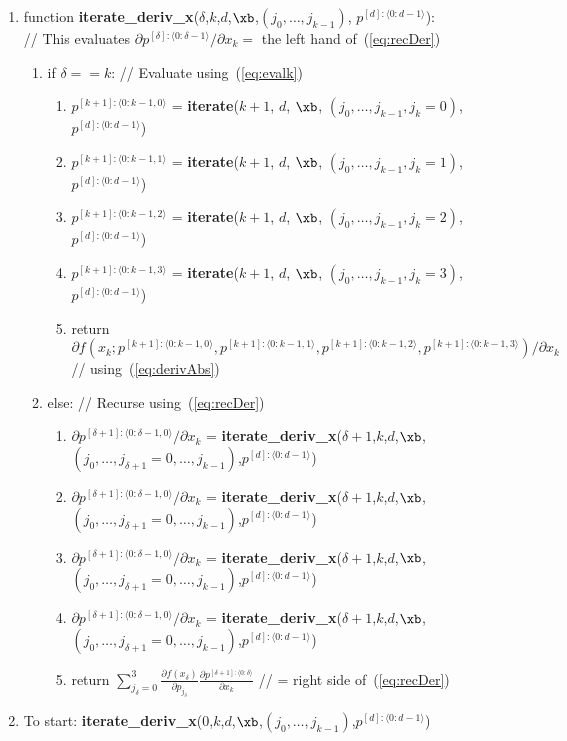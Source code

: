 \documentclass[11pt]{article}
\begin{document}
\begin{enumerate}
\item function \textbf{iterate\_deriv\_x}($\delta$,$k$,$d$,$\xb$,$(j_0, \dots, j_{k-1})$, $p^{[d]:\langle 0:d-1 \rangle}$): \\
// This evaluates $\partial p^{[\delta]: \langle 0:\delta-1 \rangle} / \partial x_k = $ the left hand of~(\ref{eq:recDer})
\begin{enumerate}
\item if $\delta == k$: // Evaluate using~(\ref{eq:evalk})
\begin{enumerate}
\item $p^{[k+1]: \langle 0:k-1,0 \rangle}$ = \textbf{iterate}($k+1$, $d$, $\xb$, $(j_{0}, \dots, j_{k-1}, j_k=0)$, $p^{[d]:\langle 0:d-1 \rangle}$)
\item $p^{[k+1]: \langle 0:k-1,1 \rangle}$ = \textbf{iterate}($k+1$, $d$, $\xb$, $(j_{0}, \dots, j_{k-1}, j_k=1)$, $p^{[d]:\langle 0:d-1 \rangle}$)
\item $p^{[k+1]: \langle 0:k-1,2 \rangle}$ = \textbf{iterate}($k+1$, $d$, $\xb$, $(j_{0}, \dots, j_{k-1}, j_k=2)$, $p^{[d]:\langle 0:d-1 \rangle}$)
\item $p^{[k+1]: \langle 0:k-1,3 \rangle}$ = \textbf{iterate}($k+1$, $d$, $\xb$, $(j_{0}, \dots, j_{k-1}, j_k=3)$, $p^{[d]:\langle 0:d-1 \rangle}$)
\item return $\partial
f \left ( 
x_{k} ; 
p^{[k+1]: \langle 0:k-1,0 \rangle},
p^{[k+1]: \langle 0:k-1,1 \rangle},
p^{[k+1]: \langle 0:k-1,2 \rangle},
p^{[k+1]: \langle 0:k-1,3 \rangle}
\right ) 
/
\partial x_k
$ // using~(\ref{eq:derivAbs})
\end{enumerate}
\item else: // Recurse using~(\ref{eq:recDer})
\begin{enumerate}
\item $\partial p^{[\delta+1]: \langle 0:\delta-1,0 \rangle} / \partial x_k$ = \textbf{iterate\_deriv\_x}($\delta+1$,$k$,$d$,$\xb$,$(j_0, \dots, j_{\delta+1} = 0,\dots, j_{k-1})$,$p^{[d]:\langle 0:d-1 \rangle}$)
\item $\partial p^{[\delta+1]: \langle 0:\delta-1,0 \rangle} / \partial x_k$ = \textbf{iterate\_deriv\_x}($\delta+1$,$k$,$d$,$\xb$,$(j_0, \dots, j_{\delta+1} = 0,\dots, j_{k-1})$,$p^{[d]:\langle 0:d-1 \rangle}$)
\item $\partial p^{[\delta+1]: \langle 0:\delta-1,0 \rangle} / \partial x_k$ = \textbf{iterate\_deriv\_x}($\delta+1$,$k$,$d$,$\xb$,$(j_0, \dots, j_{\delta+1} = 0,\dots, j_{k-1})$,$p^{[d]:\langle 0:d-1 \rangle}$)
\item $\partial p^{[\delta+1]: \langle 0:\delta-1,0 \rangle} / \partial x_k$ = \textbf{iterate\_deriv\_x}($\delta+1$,$k$,$d$,$\xb$,$(j_0, \dots, j_{\delta+1} = 0,\dots, j_{k-1})$,$p^{[d]:\langle 0:d-1 \rangle}$)
\item return $
\sum_{j_\delta=0}^3 
\frac{
\partial f(x_\delta)
}{
\partial p_{j_\delta}
}
\frac{\partial p^{[\delta+1]: \langle 0:\delta \rangle}
}{
\partial x_k
}
$ // = right side of~(\ref{eq:recDer})
\end{enumerate}
\end{enumerate}

\item To start: \textbf{iterate\_deriv\_x}($0$,$k$,$d$,$\xb$,$(j_0, \dots, j_{k-1})$,$p^{[d]:\langle 0:d-1 \rangle}$)
\end{enumerate}
\end{document}
